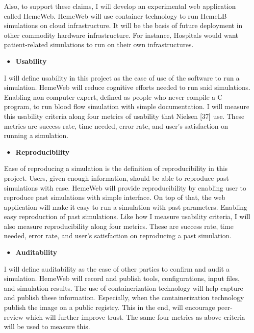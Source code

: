 \documentclass[]{article}
\providecommand{\tightlist}{%
  \setlength{\itemsep}{0pt}\setlength{\parskip}{0pt}}
\begin{document}
Also, to support these claims, I will develop an experimental web
application called HemeWeb. HemeWeb will use container technology to run
HemeLB simulations on cloud infrastructure. It will be the basis of
future deployment in other commodity hardware infrastructure. For
instance, Hospitals would want patient-related simulations to run on
their own infrastructures.

\begin{itemize}
\tightlist
\item
  \textbf{Usability}
\end{itemize}

I will define usability in this project as the ease of use of the
software to run a simulation. HemeWeb will reduce cognitive efforts
needed to run said simulations. Enabling non computer expert, defined as
people who never compile a C program, to run blood flow simulation with
simple documentation. I will measure this usability criteria along four
metrics of usability that Nielsen {[}37{]} use. These metrics are
success rate, time needed, error rate, and user's satisfaction on
running a simulation.

\begin{itemize}
\tightlist
\item
  \textbf{Reproducibility}
\end{itemize}

Ease of reproducing a simulation is the definition of reproducibility in
this project. Users, given enough information, should be able to
reproduce past simulations with ease. HemeWeb will provide
reproducibility by enabling user to reproduce past simulations with
simple interface. On top of that, the web application will make it easy
to run a simulation with past parameters. Enabling easy reproduction of
past simulations. Like how I measure usability criteria, I will also
measure reproducibility along four metrics. These are success rate, time
needed, error rate, and user's satisfaction on reproducing a past
simulation.

\begin{itemize}
\tightlist
\item
  \textbf{Auditability}
\end{itemize}

I will define auditability as the ease of other parties to confirm and
audit a simulation. HemeWeb will record and publish tools,
configurations, input files, and simulation results. The use of
containerization technology will help capture and publish these
information. Especially, when the containerization technology publish
the image on a public registry. This in the end, will encourage
peer-review which will further improve trust. The same four metrics as
above criteria will be used to measure this.
\end{document}
